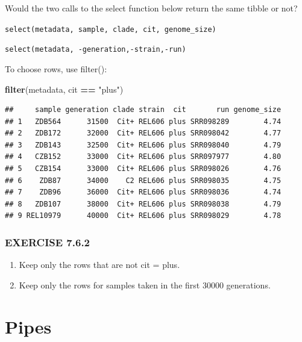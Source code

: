 \documentclass[
]{book}
\newenvironment{Shaded}{\begin{snugshade}}{\end{snugshade}}
\newcommand{\FunctionTok}[1]{\textcolor[rgb]{0.13,0.29,0.53}{\textbf{#1}}}
\newcommand{\NormalTok}[1]{#1}
\newcommand{\SpecialCharTok}[1]{\textcolor[rgb]{0.81,0.36,0.00}{\textbf{#1}}}
\newcommand{\StringTok}[1]{\textcolor[rgb]{0.31,0.60,0.02}{#1}}
\providecommand{\tightlist}{%
  \setlength{\itemsep}{0pt}\setlength{\parskip}{0pt}}
\begin{document}
Would the two calls to the select function below return the same tibble or not?

\texttt{select(metadata,\ sample,\ clade,\ cit,\ genome\_size)}

\texttt{select(metadata,\ -generation,-strain,-run)}

To choose rows, use filter():

\begin{Shaded}
\begin{Highlighting}[]
\FunctionTok{filter}\NormalTok{(metadata, cit }\SpecialCharTok{==} \StringTok{"plus"}\NormalTok{)}
\end{Highlighting}
\end{Shaded}

\begin{verbatim}
##     sample generation clade strain  cit       run genome_size
## 1   ZDB564      31500  Cit+ REL606 plus SRR098289        4.74
## 2   ZDB172      32000  Cit+ REL606 plus SRR098042        4.77
## 3   ZDB143      32500  Cit+ REL606 plus SRR098040        4.79
## 4   CZB152      33000  Cit+ REL606 plus SRR097977        4.80
## 5   CZB154      33000  Cit+ REL606 plus SRR098026        4.76
## 6    ZDB87      34000    C2 REL606 plus SRR098035        4.75
## 7    ZDB96      36000  Cit+ REL606 plus SRR098036        4.74
## 8   ZDB107      38000  Cit+ REL606 plus SRR098038        4.79
## 9 REL10979      40000  Cit+ REL606 plus SRR098029        4.78
\end{verbatim}

\subsubsection*{EXERCISE 7.6.2}\label{exercise-7.6.2}

\begin{enumerate}
\def\labelenumi{\arabic{enumi}.}
\tightlist
\item
  Keep only the rows that are not cit = plus.
\item
  Keep only the rows for samples taken in the first 30000 generations.
\end{enumerate}

\section{Pipes}\label{pipes}
\end{document}
